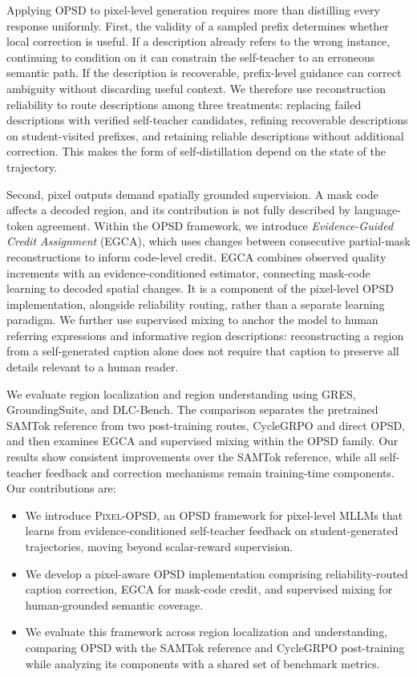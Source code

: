 \documentclass{article}
\newcommand{\ours}{\textsc{Pixel-OPSD}}
\begin{document}
Applying OPSD to pixel-level generation requires more than distilling every response uniformly. First, the validity of a sampled prefix determines whether local correction is useful. If a description already refers to the wrong instance, continuing to condition on it can constrain the self-teacher to an erroneous semantic path. If the description is recoverable, prefix-level guidance can correct ambiguity without discarding useful context. We therefore use reconstruction reliability to route descriptions among three treatments: replacing failed descriptions with verified self-teacher candidates, refining recoverable descriptions on student-visited prefixes, and retaining reliable descriptions without additional correction. This makes the form of self-distillation depend on the state of the trajectory.

Second, pixel outputs demand spatially grounded supervision. A mask code affects a decoded region, and its contribution is not fully described by language-token agreement. Within the OPSD framework, we introduce \emph{Evidence-Guided Credit Assignment} (EGCA), which uses changes between consecutive partial-mask reconstructions to inform code-level credit. EGCA combines observed quality increments with an evidence-conditioned estimator, connecting mask-code learning to decoded spatial changes. It is a component of the pixel-level OPSD implementation, alongside reliability routing, rather than a separate learning paradigm. We further use supervised mixing to anchor the model to human referring expressions and informative region descriptions: reconstructing a region from a self-generated caption alone does not require that caption to preserve all details relevant to a human reader.

We evaluate region localization and region understanding using GRES, GroundingSuite, and DLC-Bench. The comparison separates the pretrained SAMTok reference from two post-training routes, CycleGRPO and direct OPSD, and then examines EGCA and supervised mixing within the OPSD family. Our results show consistent improvements over the SAMTok reference, while all self-teacher feedback and correction mechanisms remain training-time components. Our contributions are:
\begin{itemize}
\item We introduce \ours{}, an OPSD framework for pixel-level MLLMs that learns from evidence-conditioned self-teacher feedback on student-generated trajectories, moving beyond scalar-reward supervision.
\item We develop a pixel-aware OPSD implementation comprising reliability-routed caption correction, EGCA for mask-code credit, and supervised mixing for human-grounded semantic coverage.
\item We evaluate this framework across region localization and understanding, comparing OPSD with the SAMTok reference and CycleGRPO post-training while analyzing its components with a shared set of benchmark metrics.
\end{itemize}
\end{document}
